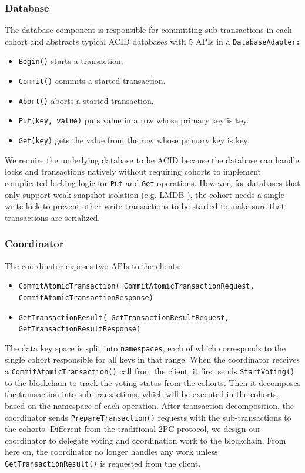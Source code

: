 \documentclass[11pt,conference]{IEEEtran}
\begin{document}
\subsubsection{Database} \label{database}
The database component is responsible for committing sub-transactions in each cohort and abstracts typical ACID databases with 5 APIs in a \texttt{DatabaseAdapter:} 
\begin{itemize}
  \item \texttt{Begin()} starts a transaction.
  \item \texttt{Commit()} commits a started transaction.
  \item \texttt{Abort()} aborts a started transaction.
  \item \texttt{Put(key, value)} puts value in a row whose primary key is key.
  \item \texttt{Get(key)} gets the value from the row whose primary key is key.
\end{itemize}

We require the underlying database to be ACID because the database can handle locks and transactions natively without requiring cohorts to implement complicated locking logic for \texttt{Put} and \texttt{Get} operations. However, for databases that only support weak snapshot isolation (e.g. LMDB \cite{}), the cohort needs a single write lock to prevent other write transactions to be started to make sure that transactions are serialized. 

\subsubsection{Coordinator} \label{coordinator}
The coordinator exposes two APIs to the clients:
\begin{itemize}
  \item \texttt{CommitAtomicTransaction( CommitAtomicTransactionRequest, CommitAtomicTransactionResponse)}
  \item \texttt{GetTransactionResult( GetTransactionResultRequest, GetTransactionResultResponse)}
\end{itemize}   

The data key space is split into \texttt{namespaces}, each of which corresponds to the single cohort responsible for all keys in that range. When the coordinator receives a \texttt{CommitAtomicTransaction()} call from the client, it first sends \texttt{StartVoting()} to the blockchain to track the voting status from the cohorts. Then it decomposes the transaction into sub-transactions, which will be executed in the cohorts, based on the namespace of each operation. After transaction decomposition, the coordinator sends \texttt{PrepareTransaction()} requests with the sub-transactions to the cohorts. Different from the traditional 2PC protocol, we design our coordinator to delegate voting and coordination work to the blockchain. From here on, the coordinator no longer handles any work unless \texttt{GetTransactionResult()} is requested from the client.
\end{document}
